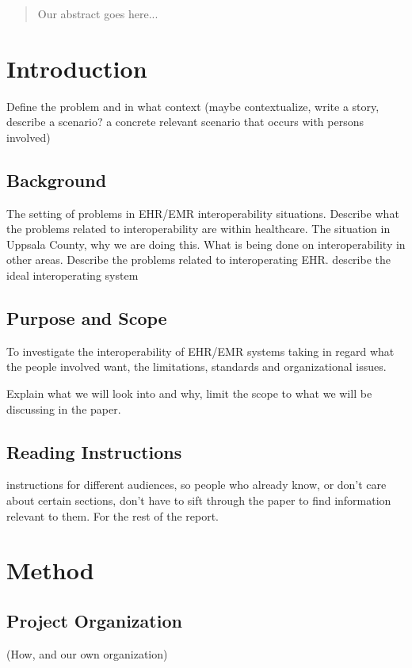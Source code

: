 \documentclass[12pt]{article}
\begin{document}
\nocite{Sh:1}



\tableofcontents
\newpage

\begin{abstract}
Our abstract goes here...
\end{abstract}

\newpage


\section{Introduction}
Define the problem and in what context (maybe contextualize, write a story, describe a scenario? a concrete relevant scenario that occurs with persons involved)

\subsection{Background}
The setting of problems in EHR/EMR interoperability situations. Describe what the problems related to interoperability are within healthcare. The situation in Uppsala County, why we are doing this. What is being done on interoperability in other areas. Describe the problems related to interoperating EHR.
describe the ideal interoperating system

\subsection{Purpose and Scope}
To investigate the interoperability of
EHR/EMR systems taking in regard what
the people involved want, the limitations,
standards and organizational issues.

Explain what we will look into and why, limit the scope to what we will be discussing in the paper.

\subsection{Reading Instructions}
instructions for different audiences, so people who already know, or don't care about certain sections, don't have to sift through the paper to find information relevant to them. For the rest of the report.


\section{Method}

\subsection{Project Organization}
 (How, and our own organization)
\end{document}
